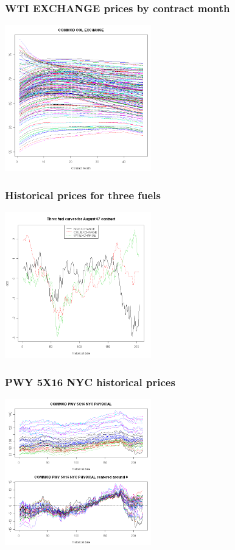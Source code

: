 \documentclass[10pt]{beamer}
\begin{document}
\frame
{
  \frametitle{WTI EXCHANGE  prices by contract month}

\begin{center}
  \includegraphics[height=2.5in]{figures/wti02.png}
\end{center}
}

\frame
{
  \frametitle{Historical prices for three fuels}
\begin{center}
  \includegraphics[height=2.5in]{figures/allfuels.png}
\end{center}
}


\frame
{
  \frametitle{PWY 5X16 NYC historical prices}

\begin{center}
  \includegraphics[height=2.5in]{figures/pwy01.png}
\end{center}
}
\end{document}
